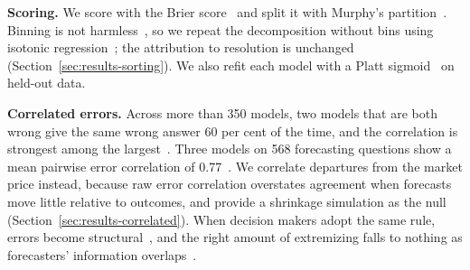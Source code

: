 \textbf{Scoring.} We score with the Brier score~\citep{brier1950} and split it
with Murphy's partition~\citep{murphy1973}. Binning is not
harmless~\citep{stephenson2008}, so we repeat the decomposition without bins
using isotonic regression~\citep{dimitriadis2021}; the attribution to resolution is
unchanged (Section~\ref{sec:results-sorting}). We also refit each model with a
Platt sigmoid~\citep{platt1999} on held-out data.

\textbf{Correlated errors.} Across more than 350 models, two models that are both
wrong give the same wrong answer 60 per cent of the time, and the correlation is
strongest among the largest~\citep{kim2025correlated}. Three models on 568
forecasting questions show a mean pairwise error correlation of
0.77~\citep{spiro2026}. We
correlate departures from the market price instead, because raw error correlation
overstates agreement when forecasts move little relative to outcomes, and provide
a shrinkage simulation as the null
(Section~\ref{sec:results-correlated}). When decision makers adopt the same
rule, errors become structural~\citep{kleinberg2021}, and the right amount of
extremizing falls to nothing as forecasters' information
overlaps~\citep{satopaa2016}.

